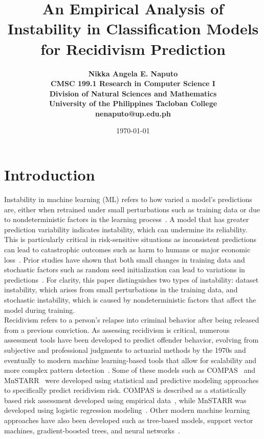 \documentclass[12pt]{article}
\title{\bfseries An Empirical Analysis of Instability in Classification Models for Recidivism Prediction}
\author{\bfseries 
  Nikka Angela E. Naputo\\
  CMSC 199.1 Research in Computer Science I\\
  Division of Natural Sciences and Mathematics\\
  University of the Philippines Tacloban College\\
  {\small nenaputo@up.edu.ph}
}
\date{\today}
\begin{document}
\sloppy %

\maketitle 
\newpage 

\tableofcontents 
\newpage

\section{Introduction} 
\tab%
Instability in machine learning (ML) refers to how varied a model's predictions are, either when retrained under small perturbations such as training data or due to nondeterministic factors in the learning process~\cite{sun2015stability}. A model that has greater prediction variability indicates instability, which can undermine its reliability. This is particularly critical in risk-sensitive situations as inconsistent predictions can lead to catastrophic outcomes such as harm to humans or major economic loss~\cite{zhang2024reliability}. Prior studies have shown that both small changes in training data and stochastic factors such as random seed initialization can lead to variations in predictions~\cite{riley2023stability, lopez2022instability}. For clarity, this paper distinguishes two types of instability: dataset instability, which arises from small perturbations in the training data, and stochastic instability, which is caused by nondeterministic factors that affect the model during training. \\

Recidivism refers to a person's relapse into criminal behavior after being released from a previous conviction. As assessing recidivism is critical, numerous assessment tools have been developed to predict offender behavior, evolving from subjective and professional judgments to actuarial methods by the 1970s and eventually to modern machine learning-based tools that allow for scalability and more complex pattern detection~\cite{bonta2007risk, duwe2017out}. Some of these models such as COMPAS~\cite{northpointe2015practitioner} and MnSTARR~\cite{duwe2014development} were developed using statistical and predictive modeling approaches to specifically predict recidivism risk. COMPAS is described as a statistically based risk assessment developed using empirical data~\cite{northpointe2015practitioner}, while MnSTARR was developed using logistic regression modeling~\cite{duwe2014development}. Other modern machine learning approaches have also been developed such as tree-based models, support vector machines, gradient-boosted trees, and neural networks~\cite{duwe2017out}.\\
\end{document}
